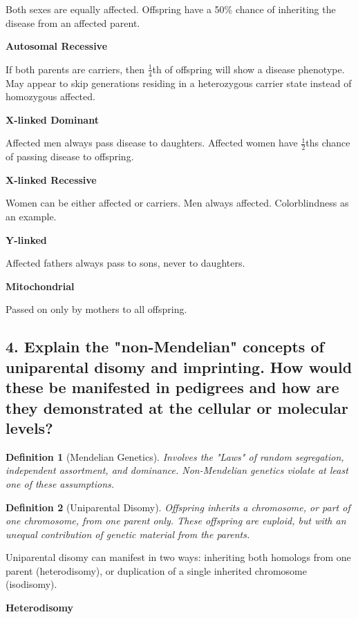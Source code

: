 \documentclass{tufte-handout}
\theoremstyle{noparens}
\newtheorem*{define}{Definition}
\begin{document}
 Both sexes are equally affected. Offspring have a 50\% chance of inheriting the disease from an affected parent.
 
 \noindent
 \textbf{Autosomal Recessive}
 
 If both parents are carriers, then $\frac{1}{4}$th of offspring will show a disease phenotype. May appear to skip generations residing in a heterozygous carrier state instead of homozygous affected.
 
 \noindent
 \textbf{X-linked Dominant}
 
Affected men always pass disease to daughters. Affected women have $\frac{1}{2}$ths chance of passing disease to offspring.
 
 \noindent
 \textbf{X-linked Recessive}
 
Women can be either affected or carriers. Men always affected. Colorblindness as an example.
 
\noindent
\textbf{Y-linked}

Affected fathers always pass to sons, never to daughters.

\noindent
\textbf{Mitochondrial}

Passed on only by mothers to all offspring.
 
\newpage
\subsection{4.
Explain the "non-Mendelian" concepts of uniparental disomy and imprinting. How would these be manifested in pedigrees and how are they demonstrated at the cellular or molecular levels?}
\label{subsec:04}

\begin{define}[Mendelian Genetics]
Involves the "Laws" of random segregation, independent assortment, and dominance. Non-Mendelian genetics violate at least one of these assumptions.
\end{define}

\begin{define}[Uniparental Disomy]
Offspring inherits a chromosome, or part of one chromosome, from one parent only. These offspring are euploid, but with an unequal contribution of genetic material from the parents.
\end{define}

Uniparental disomy can manifest in two ways: inheriting both homologs from one parent (heterodisomy), or duplication of a single inherited chromosome (isodisomy).

\textbf{Heterodisomy}
\end{document}

